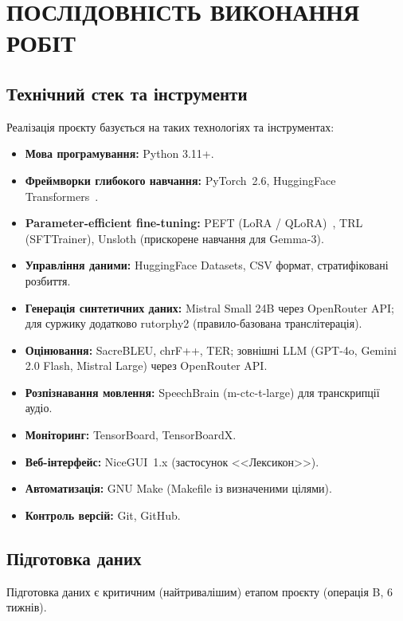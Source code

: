 \documentclass[14pt]{extarticle}
\begin{document}
\clearpage

\section{ПОСЛІДОВНІСТЬ ВИКОНАННЯ РОБІТ}

\subsection{Технічний стек та інструменти}

Реалізація проєкту базується на таких технологіях та інструментах:

\begin{itemize}
  \item \textbf{Мова програмування:} Python 3.11+.
  \item \textbf{Фреймворки глибокого навчання:} PyTorch~2.6, HuggingFace Transformers~\cite{hf_transformers}.
  \item \textbf{Parameter-efficient fine-tuning:} PEFT (LoRA / QLoRA)~\cite{lora,qlora}, TRL (SFTTrainer), Unsloth (прискорене навчання для Gemma-3).
  \item \textbf{Управління даними:} HuggingFace Datasets, CSV формат, стратифіковані розбиття.
  \item \textbf{Генерація синтетичних даних:} Mistral Small 24B через OpenRouter API; для суржику додатково rutorphy2 (правило-базована транслітерація).
  \item \textbf{Оцінювання:} SacreBLEU, chrF++, TER; зовнішні LLM (GPT-4o, Gemini 2.0 Flash, Mistral Large) через OpenRouter API.
  \item \textbf{Розпізнавання мовлення:} SpeechBrain (m-ctc-t-large) для транскрипції аудіо.
  \item \textbf{Моніторинг:} TensorBoard, TensorBoardX.
  \item \textbf{Веб-інтерфейс:} NiceGUI~1.x (застосунок <<Лексикон>>).
  \item \textbf{Автоматизація:} GNU Make (Makefile із визначеними цілями).
  \item \textbf{Контроль версій:} Git, GitHub.
\end{itemize}

\subsection{Підготовка даних}

Підготовка даних є критичним (найтривалішим) етапом проєкту (операція B, 6 тижнів).
\end{document}
